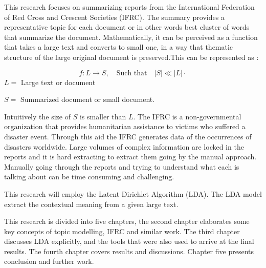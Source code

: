 This research focuses on summarizing reports from the International Federation of Red Cross and Crescent Societies (IFRC). The summary provides  a  representative topic for each document or in other words best cluster of words that summarize the document. Mathematically, it can be perceived as a function that takes a large text and converts to small one, in a way that thematic structure of the large original document is preserved.This can be represented as :

$$f:L \longrightarrow S, \quad \text{Such that} \quad |S|\ll |L| \cdot$$
$L=$ Large text or document

 $S=$ Summarized document or small document.
  
Intuitively the size of $S$ is smaller than $L$.
The IFRC is a non-governmental organization
that provides humanitarian assistance to victims who suffered a disaster event. Through this aid the 	IFRC generates data of the occurrences of disasters worldwide. Large volumes of complex information    are locked in the reports and it is hard extracting to extract them going by the manual approach.
Manually going through the reports and trying to understand what each is talking about can be time consuming and challenging.  

This research will employ the Latent Dirichlet Algorithm (LDA).
 The LDA model extract the contextual meaning from a given large text. 

This research is divided into five chapters, the second chapter elaborates some key concepts of topic modelling, IFRC and similar work. The third chapter discusses LDA explicitly,  and the tools that were also used to arrive at the final results. The fourth chapter covers results and discussions. Chapter five presents conclusion and further work.

  
